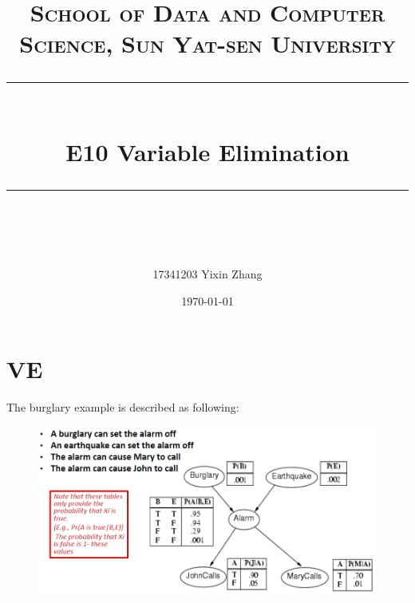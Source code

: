 \documentclass[a4paper, 11pt]{article}
\title{	
\normalfont \normalsize
\textsc{School of Data and Computer Science, Sun Yat-sen University} \\ [25pt] %
\rule{\textwidth}{0.5pt} \\[0.4cm] %
\huge  E10 Variable Elimination \\ %
\rule{\textwidth}{2pt} \\[0.5cm] %
\author{17341203 Yixin Zhang}
\date{\normalsize\today}
}
\begin{document}
\maketitle
\tableofcontents
\newpage


\section{VE}

The burglary example is described as following:
\begin{figure}[h]
  \centering

  \includegraphics[width=14cm]{Pic/burglary}
\end{figure}
\end{document}
